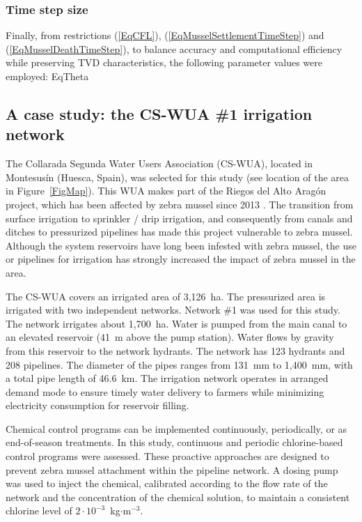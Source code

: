 \documentclass[review,authoryear]{elsarticle}
\begin{document}
\subsubsection{Time step size}

Finally, from restrictions (\ref{EqCFL}), (\ref{EqMusselSettlementTimeStep}) and
(\ref{EqMusselDeathTimeStep}), to balance accuracy and computational efficiency
while preserving TVD characteristics, the following parameter values were
employed:
{EqTheta}

\subsection{A case study: the CS-WUA \#1 irrigation network}

The Collarada Segunda Water Users Association (CS-WUA), located in Montesusín
(Huesca, Spain), was selected for this study (see location of the area in
Figure~\ref{FigMap}). This WUA makes part of the Riegos
del Alto Aragón project, which has been affected by zebra mussel since 2013
\citep{MoralesHernandez18}. The transition from surface irrigation to sprinkler
/ drip irrigation, and consequently from canals and ditches to pressurized
pipelines has made this project vulnerable to zebra mussel. Although the system
reservoirs have long been infested with zebra mussel, the use or pipelines for
irrigation has strongly increased the impact of zebra mussel in the area.

The CS-WUA covers an irrigated area of 3,126~ha. The pressurized area is
irrigated with two independent networks. Network \#1 was used for this study.
The network irrigates about 1,700~ha. Water is pumped from the main canal to an
elevated reservoir (41~m above the pump station). Water flows by gravity from
this reservoir to the network hydrants. The network has 123 hydrants and 208
pipelines. The diameter of the pipes ranges from 131~mm to 1,400~mm, with a
total pipe length of 46.6~km. The irrigation network operates in arranged demand
mode \citep{Clemmens87} to ensure timely water delivery to farmers while
minimizing electricity consumption for reservoir filling.

Chemical control programs can be implemented continuously, periodically, or as
end-of-season treatments. In this study, continuous and periodic chlorine-based
control programs were assessed. These proactive approaches are designed to
prevent zebra mussel attachment within the pipeline network. A dosing pump was
used to inject the chemical, calibrated according to the flow rate of the
network and the concentration of the chemical solution, to maintain a consistent
chlorine level of $2\cdot10^{-3}$~kg$\cdot$m$^{-3}$.
\end{document}
